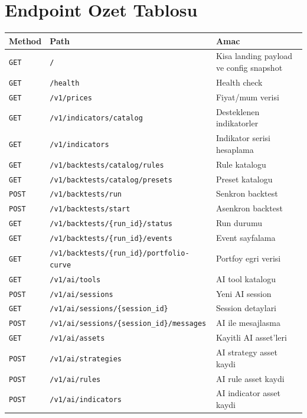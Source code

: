 \documentclass[11pt,a4paper]{article}
\begin{document}
\section{Endpoint Ozet Tablosu}

\begin{longtable}{>{\raggedright\arraybackslash}p{2.4cm} >{\raggedright\arraybackslash}p{5.8cm} >{\raggedright\arraybackslash}p{6cm}}
\toprule
Method & Path & Amac \\
\midrule
\endhead
\texttt{GET} & \texttt{/} & Kisa landing payload ve config snapshot \\
\texttt{GET} & \texttt{/health} & Health check \\
\texttt{GET} & \texttt{/v1/prices} & Fiyat/mum verisi \\
\texttt{GET} & \texttt{/v1/indicators/catalog} & Desteklenen indikatorler \\
\texttt{GET} & \texttt{/v1/indicators} & Indikator serisi hesaplama \\
\texttt{GET} & \texttt{/v1/backtests/catalog/rules} & Rule katalogu \\
\texttt{GET} & \texttt{/v1/backtests/catalog/presets} & Preset katalogu \\
\texttt{POST} & \texttt{/v1/backtests/run} & Senkron backtest \\
\texttt{POST} & \texttt{/v1/backtests/start} & Asenkron backtest \\
\texttt{GET} & \texttt{/v1/backtests/\{run\_id\}/status} & Run durumu \\
\texttt{GET} & \texttt{/v1/backtests/\{run\_id\}/events} & Event sayfalama \\
\texttt{GET} & \texttt{/v1/backtests/\{run\_id\}/portfolio-curve} & Portfoy egri verisi \\
\texttt{GET} & \texttt{/v1/ai/tools} & AI tool katalogu \\
\texttt{POST} & \texttt{/v1/ai/sessions} & Yeni AI session \\
\texttt{GET} & \texttt{/v1/ai/sessions/\{session\_id\}} & Session detaylari \\
\texttt{POST} & \texttt{/v1/ai/sessions/\{session\_id\}/messages} & AI ile mesajlasma \\
\texttt{GET} & \texttt{/v1/ai/assets} & Kayitli AI asset'leri \\
\texttt{POST} & \texttt{/v1/ai/strategies} & AI strategy asset kaydi \\
\texttt{POST} & \texttt{/v1/ai/rules} & AI rule asset kaydi \\
\texttt{POST} & \texttt{/v1/ai/indicators} & AI indicator asset kaydi \\
\bottomrule
\end{longtable}
\end{document}
